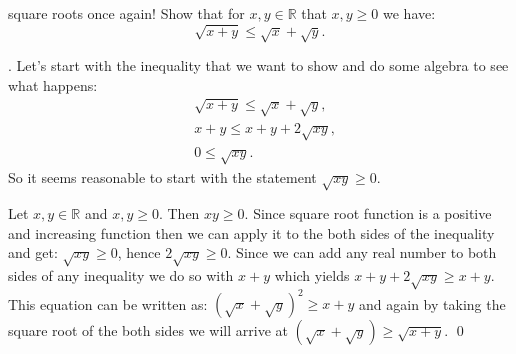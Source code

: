\begin{example}{square roots once again!}
	 Show that for $ x,y \in \mathbb{R} $ that $ x,y \geq 0 $ we have: 
	\[\sqrt{x+y} \leq \sqrt{x} + \sqrt{y}.  \]
	
	. Let's start with the inequality that we want to show and do some algebra to see what happens:
	\begin{align*}
		&\sqrt{x+y} \leq \sqrt{x} + \sqrt{y}, \\
		&x+y \leq x + y + 2\sqrt{xy}, \\
		&0 \leq \sqrt{xy}.
	\end{align*}
	So it seems reasonable to start with the statement $ \sqrt{xy} \geq 0 $.
	
	 Let $ x,y \in \mathbb{R} $ and $ x,y \geq 0 $. Then $ xy \geq 0 $. Since square root function is a positive and increasing function then we can apply it to the both sides of the inequality and get: $ \sqrt{xy} \geq 0 $, hence $ 2 \sqrt{xy} \geq 0 $. Since we can add any real number to both sides of any inequality we do so with $ x+y $ which yields $ x+y+2\sqrt{xy} \geq x+y $. This equation can be written as: $ (\sqrt{x} + \sqrt{y})^2 \geq x+y $ and again by taking the square root of the both sides we will arrive at $ (\sqrt{x} + \sqrt{y}) \geq \sqrt{x+y}. $ \qed
\end{example}









